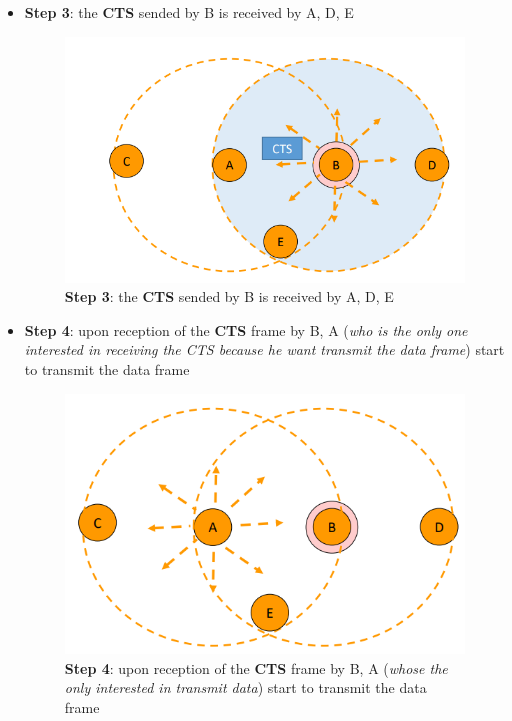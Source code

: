 \documentclass[10pt,a4paper]{report}
\theoremstyle{definition}
\begin{document}
\begin{itemize}
	\item 
	\textbf{Step 3}: the \textbf{CTS} sended by B is received by A, D, E
	\begin{figure}[h!]
		\centering
		\includegraphics[scale=0.50]{images/Pasted image 20230225102504.png}
		\caption{\textbf{Step 3}: the \textbf{CTS} sended by B is received by A, D, E}
	\end{figure}
	
	\item 
	\textbf{Step 4}: upon reception of the \textbf{CTS} frame by B, A (\textit{who is the only one interested in receiving the CTS because he want transmit the data frame}) start to transmit the data frame
	\begin{figure}[h!]
		\centering
		\includegraphics[scale=0.50]{images/Pasted image 20230225102530.png}
		\caption{\textbf{Step 4}: upon reception of the \textbf{CTS} frame by B, A (\textit{whose the only interested in transmit data}) start to transmit the data frame}
	\end{figure}
	
\end{itemize}
\end{document}
